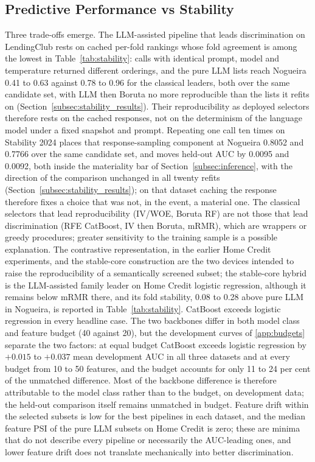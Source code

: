 \documentclass[final,5p,twocolumn]{elsarticle}
\begin{document}
\subsection{Predictive Performance vs Stability}
\label{subsec:performance_vs_stability}

Three trade-offs emerge. The LLM-assisted pipeline that leads discrimination on LendingClub rests on cached per-fold rankings whose fold agreement is among the lowest in Table~\ref{tab:stability}: calls with identical prompt, model and temperature returned different orderings, and the pure LLM lists reach Nogueira 0.41 to 0.63 against 0.78 to 0.96 for the classical leaders, both over the same candidate set, with LLM then Boruta no more reproducible than the lists it refits on (Section~\ref{subsec:stability_results}). Their reproducibility as deployed selectors therefore rests on the cached responses, not on the determinism of the language model under a fixed snapshot and prompt. Repeating one call ten times on Stability 2024 places that response-sampling component at Nogueira 0.8052 and 0.7766 over the same candidate set, and moves held-out AUC by 0.0095 and 0.0092, both inside the materiality bar of Section~\ref{subsec:inference}, with the direction of the comparison unchanged in all twenty refits (Section~\ref{subsec:stability_results}); on that dataset caching the response therefore fixes a choice that was not, in the event, a material one. The classical selectors that lead reproducibility (IV/WOE, Boruta RF) are not those that lead discrimination (RFE CatBoost, IV then Boruta, mRMR), which are wrappers or greedy procedures; greater sensitivity to the training sample is a possible explanation. The contrastive representation, in the earlier Home Credit experiments, and the stable-core construction are the two devices intended to raise the reproducibility of a semantically screened subset; the stable-core hybrid is the LLM-assisted family leader on Home Credit logistic regression, although it remains below mRMR there, and its fold stability, 0.08 to 0.28 above pure LLM in Nogueira, is reported in Table~\ref{tab:stability}. CatBoost exceeds logistic regression in every headline case. The two backbones differ in both model class and feature budget (40 against 20), but the development curves of \ref{app:budgets} separate the two factors: at equal budget CatBoost exceeds logistic regression by $+0.015$ to $+0.037$ mean development AUC in all three datasets and at every budget from 10 to 50 features, and the budget accounts for only 11 to 24 per cent of the unmatched difference. Most of the backbone difference is therefore attributable to the model class rather than to the budget, on development data; the held-out comparison itself remains unmatched in budget. Feature drift within the selected subsets is low for the best pipelines in each dataset, and the median feature PSI of the pure LLM subsets on Home Credit is zero; these are minima that do not describe every pipeline or necessarily the AUC-leading ones, and lower feature drift does not translate mechanically into better discrimination.
\end{document}
